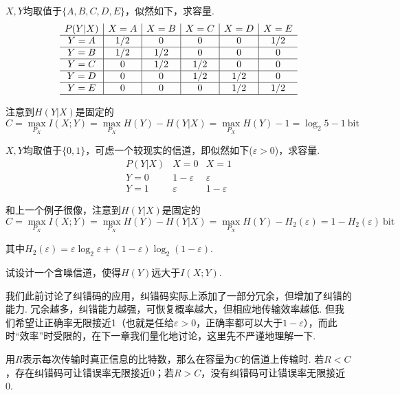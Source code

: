 \begin{example}
    $X,Y$均取值于$\{A,B,C,D,E\}$，似然如下，求容量.
    \[
    \begin{array}{c|c|c|c|c|c}
        P(Y|X) & X=A & X=B & X=C & X=D & X=E\\ \hline 
        Y=A & 1/2 & 0 & 0 & 0 & 1/2\\ \hline 
        Y=B & 1/2 & 1/2 & 0 & 0 & 0\\ \hline   
        Y=C & 0 & 1/2 & 1/2 & 0 & 0\\ \hline 
        Y=D & 0 & 0 & 1/2 & 1/2 & 0\\ \hline 
        Y=E & 0 & 0 & 0 & 1/2 & 1/2\\ \hline   
    \end{array}
    \]
\end{example}
\begin{solution}
    注意到$H(Y|X)$是固定的
    \[
    C = \max_{P_X} I(X;Y) = \max_{P_X} H(Y) - H(Y|X) = \max_{P_X} H(Y) - 1 = \log_2 5 - 1 \ \text{bit}
    \]
\end{solution}

\begin{example}
    $X,Y$均取值于$\{0,1\}$，可虑一个较现实的信道，即似然如下($\varepsilon > 0$)，求容量.
    \[
    \begin{array}{c|c|c}
        P(Y|X) & X=0 & X=1 \\ \hline 
        Y=0 & 1 - \varepsilon & \varepsilon \\ \hline
        Y=1 & \varepsilon & 1 - \varepsilon
    \end{array}
    \]
\end{example}
\begin{solution}
    和上一个例子很像，注意到$H(Y|X)$是固定的
    \[
    C = \max_{P_X} I(X;Y) = \max_{P_X} H(Y) - H(Y|X) = \max_{P_X} H(Y) - H_2(\varepsilon) = 1 - H_2(\varepsilon) \ \text{bit}
    \]

    其中$H_2(\varepsilon) = \varepsilon\log_2 \varepsilon + (1-\varepsilon) \log_2(1-\varepsilon)$.
\end{solution} 

\begin{example}
    试设计一个含噪信道，使得$H(Y)$远大于$I(X;Y)$. 
\end{example}

我们此前讨论了纠错码的应用，纠错码实际上添加了一部分冗余，但增加了纠错的能力. 冗余越多，纠错能力越强，可恢复概率越大，但相应地传输效率越低.  但我们希望让正确率无限接近1（也就是任给$\varepsilon > 0$，正确率都可以大于$1-\varepsilon$），而此时“效率”时受限的，在下一章我们量化地讨论，这里先不严谨地理解一下.  

用$R$表示每次传输时真正信息的比特数，那么在容量为$C$的信道上传输时. 若$R<C$，存在纠错码可让错误率无限接近0；若$R>C$，没有纠错码可让错误率无限接近0. 


